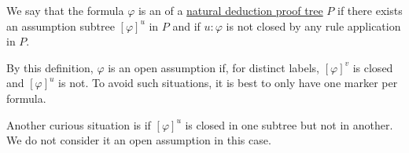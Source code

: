 \begin{definition}\label{def:natural_deduction_open_assumptions}\mimprovised
  We say that the formula \( \varphi \) is an  of a \hyperref[def:natural_deduction_proof_tree]{natural deduction proof tree} \( P \) if there exists an assumption subtree \( [\varphi]^u \) in \( P \) and if \( u: \varphi \) is not closed by any rule application in \( P \).
\end{definition}
\begin{comments}
  \item By this definition, \( \varphi \) is an open assumption if, for distinct labels, \( [\varphi]^v \) is closed and \( [\varphi]^u \) is not. To avoid such situations, it is best to only have one marker per formula.
  \item Another curious situation is if \( [\varphi]^u \) is closed in one subtree but not in another. We do not consider it an open assumption in this case.
\end{comments}

